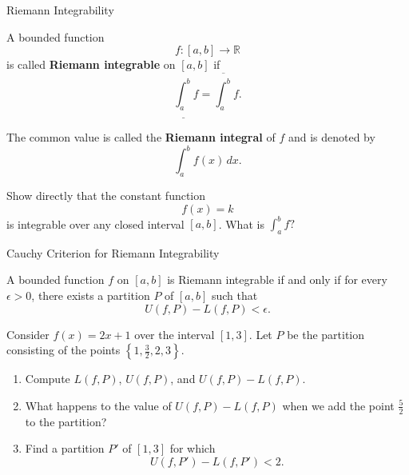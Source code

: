 \documentclass[12pt,a4paper]{article}
\begin{document}
\clearpage

\begin{heading}
Riemann Integrability
\end{heading}

\begin{definition}
A bounded function
\[
f:[a,b]\to\mathbb{R}
\]
is called \textbf{Riemann integrable} on $[a,b]$ if
\[
\underline{\int_a^b} f
=
\overline{\int_a^b} f.
\]

The common value is called the \textbf{Riemann integral} of $f$ and
is denoted by
\[
\int_a^b f(x)\,dx.
\]
\end{definition}

\clearpage

\begin{problem}
Show directly that the constant function
\[
f(x)=k
\]
is integrable over any closed interval \([a,b]\). What is
\(
\int_a^b f?
\)
\end{problem}


\clearpage

\begin{heading}
    Cauchy Criterion for Riemann Integrability
\end{heading}

\vspace{10pt}

\begin{theorem}
A bounded function $f$ on $[a,b]$ is Riemann integrable if and only if for every $\epsilon > 0$, there exists a partition $P$ of $[a,b]$ such that
\[
U(f,P) - L(f,P) < \epsilon.
\]
\end{theorem}

\clearpage

\begin{problem}
Consider \(f(x)=2x+1\) over the interval \([1,3]\). Let \(P\) be the partition consisting of the points
\(
\left\{1,\frac{3}{2},2,3\right\}.
\)

\begin{enumerate}
    \item[(a)] Compute \(L(f,P)\), \(U(f,P)\), and \(U(f,P)-L(f,P)\).

    \item[(b)] What happens to the value of \(U(f,P)-L(f,P)\) when we add the point \(\frac{5}{2}\) to the partition?

    \item[(c)] Find a partition \(P'\) of \([1,3]\) for which
    \[
    U(f,P')-L(f,P')<2.
    \]
\end{enumerate}
\end{problem}
\end{document}

